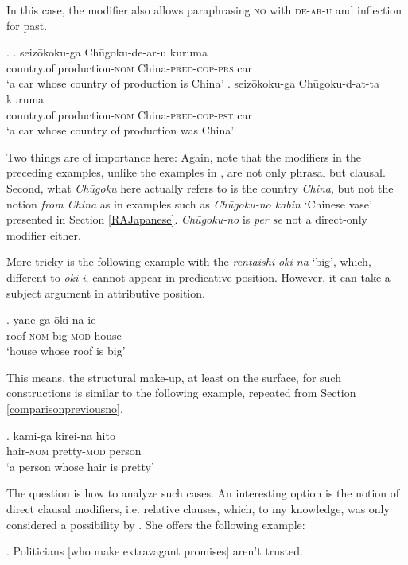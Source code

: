 In this case, the modifier also allows paraphrasing \textsc{no} with \textsc{de-ar-u} and inflection for past.

\ex. \ag. seizōkoku-ga Chūgoku-de-ar-u kuruma\\
country.of.production-\textsc{nom} China-\textsc{pred-cop-prs} car\\
`a car whose country of production is China’
\bg. seizōkoku-ga Chūgoku-d-at-ta kuruma\\
country.of.production-\textsc{nom} China-\textsc{pred-cop-pst} car\\
`a car whose country of production was China’

Two things are of importance here: Again, note that the modifiers in the preceding examples, unlike the examples in \citet{cinque:2010:adj}, are not only phrasal but clausal. Second, what \textit{Chūgoku} here actually refers to is the country \textit{China}, but not the notion \textit{from China} as in examples such as \textit{Chūgoku-no kabin} `Chinese vase’ presented in Section \ref{RAJapanese}. \textit{Chūgoku-no} is \textit{per se} not a direct-only modifier either. 

More tricky is the following example with the \textit{rentaishi} \textit{ōki-na} `big’, which, different to \textit{ōki-i}, cannot appear in predicative position. However, it can take a subject argument in attributive position.

\exg. yane-ga ōki-na ie\\
roof-\textsc{nom} big-\textsc{mod} house\\
`house whose roof is big’ \label{yane}

This means, the structural make-up, at least on the surface, for such constructions is similar to the following example, repeated from Section \ref{comparisonpreviousno}.

\exg. kami-ga kirei-na hito\\
hair-\textsc{nom} pretty-\textsc{mod} person\\
`a person whose hair is pretty' \null \hfill \citep[34]{kaplan:1995:the}

\newpage
The question is how to analyze such cases. An interesting option is the notion of direct clausal modifiers, i.e. relative clauses, which, to my knowledge, was only considered a possibility by \citet{kim:2019:syntax}. She offers the following example:

\ex. Politicians [who make extravagant promises] aren’t trusted. \\ \null \hfill \citep[139]{kim:2019:syntax}

